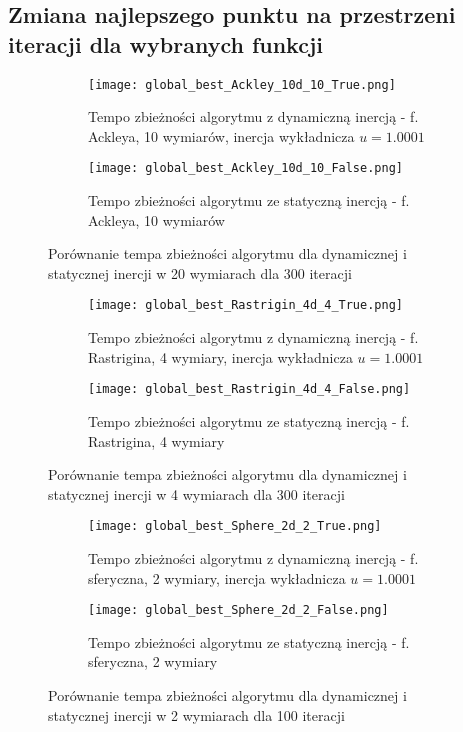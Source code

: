 \documentclass[12pt]{article}
\begin{document}
\FloatBarrier

\subsection*{Zmiana najlepszego punktu na przestrzeni iteracji dla wybranych funkcji}

\begin{figure}[ht]
	\centering
	\begin{subfigure}{0.49\textwidth}
		\texttt{[image: global\_best\_Ackley\_10d\_10\_True.png]}
		\caption{Tempo zbieżności algorytmu z dynamiczną inercją - f. Ackleya, 10 wymiarów, inercja wykładnicza $u = 1.0001$}
	\end{subfigure}
	\hfill
	\begin{subfigure}{0.49\textwidth}
		\texttt{[image: global\_best\_Ackley\_10d\_10\_False.png]}
		\caption{Tempo zbieżności algorytmu ze statyczną inercją - f. Ackleya, 10 wymiarów}
	\end{subfigure}
	\caption{Porównanie tempa zbieżności algorytmu dla dynamicznej i statycznej inercji w 20 wymiarach dla 300 iteracji}
	\label{20d_comp}
\end{figure}


\begin{figure}[ht]
	\centering
	\begin{subfigure}{0.49\textwidth}
		\texttt{[image: global\_best\_Rastrigin\_4d\_4\_True.png]}
		\caption{Tempo zbieżności algorytmu z dynamiczną inercją - f. Rastrigina, 4 wymiary, inercja wykładnicza $u = 1.0001$}
	\end{subfigure}
	\hfill
	\begin{subfigure}{0.49\textwidth}
		\texttt{[image: global\_best\_Rastrigin\_4d\_4\_False.png]}
		\caption{Tempo zbieżności algorytmu ze statyczną inercją - f. Rastrigina, 4 wymiary}
	\end{subfigure}
	\caption{Porównanie tempa zbieżności algorytmu dla dynamicznej i statycznej inercji w 4 wymiarach dla 300 iteracji}
	\label{4d_comp}
\end{figure}

\begin{figure}[ht]
	\centering
	\begin{subfigure}{0.49\textwidth}
		\texttt{[image: global\_best\_Sphere\_2d\_2\_True.png]}
		\caption{Tempo zbieżności algorytmu z dynamiczną inercją - f. sferyczna, 2 wymiary, inercja wykładnicza $u = 1.0001$}
	\end{subfigure}
	\hfill
	\begin{subfigure}{0.49\textwidth}
		\texttt{[image: global\_best\_Sphere\_2d\_2\_False.png]}
		\caption{Tempo zbieżności algorytmu ze statyczną inercją - f. sferyczna, 2 wymiary}
	\end{subfigure}
	\caption{Porównanie tempa zbieżności algorytmu dla dynamicznej i statycznej inercji w 2 wymiarach dla 100 iteracji}
	\label{2d_comp}
\end{figure}
\end{document}
